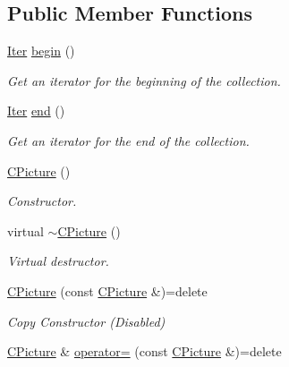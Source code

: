 \subsection*{Public Member Functions}
\begin{DoxyCompactItemize}
\item 
\hyperlink{class_c_picture_1_1_iter}{Iter} \hyperlink{class_c_picture_a5a4a9a34afcb8d8b6cbb337842292dcd}{begin} ()
\begin{DoxyCompactList}\small\item\em Get an iterator for the beginning of the collection. \end{DoxyCompactList}\item 
\hyperlink{class_c_picture_1_1_iter}{Iter} \hyperlink{class_c_picture_a49b85877b88711bd3e5dee27a439b16c}{end} ()
\begin{DoxyCompactList}\small\item\em Get an iterator for the end of the collection. \end{DoxyCompactList}\item 
\hyperlink{class_c_picture_a4e3783bef1f9d565b8a9f5e9680685ab}{C\+Picture} ()
\begin{DoxyCompactList}\small\item\em Constructor. \end{DoxyCompactList}\item 
virtual \hyperlink{class_c_picture_a763d6f41025f8e3f39c3ed264aac623c}{$\sim$\+C\+Picture} ()
\begin{DoxyCompactList}\small\item\em Virtual destructor. \end{DoxyCompactList}\item 
\hyperlink{class_c_picture_aa74c697e3bcca50430acbfa582f7a928}{C\+Picture} (const \hyperlink{class_c_picture}{C\+Picture} \&)=delete
\begin{DoxyCompactList}\small\item\em Copy Constructor (Disabled) \end{DoxyCompactList}\item 
\hypertarget{class_c_picture_a8b0fe5e8e17f415d010eedab79555b6e}{\hyperlink{class_c_picture}{C\+Picture} \& \hyperlink{class_c_picture_a8b0fe5e8e17f415d010eedab79555b6e}{operator=} (const \hyperlink{class_c_picture}{C\+Picture} \&)=delete}\label{class_c_picture_a8b0fe5e8e17f415d010eedab79555b6e}


\end{DoxyCompactItemize}
